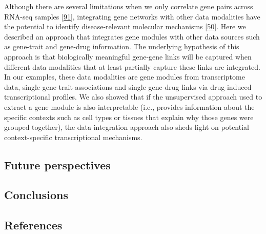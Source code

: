 Although there are several limitations when we only correlate gene pairs across RNA-seq samples {[}\protect\hyperlink{ref-jVQ2rMqc}{91}{]}, integrating gene networks with other data modalities have the potential to identify disease-relevant molecular mechanisms {[}\protect\hyperlink{ref-dg9nKuy0}{50}{]}.
Here we described an approach that integrates gene modules with other data sources such as gene-trait and gene-drug information.
The underlying hypothesis of this approach is that biologically meaningful gene-gene links will be captured when different data modalities that at least partially capture these links are integrated.
In our examples, these data modalities are gene modules from transcriptome data, single gene-trait associations and single gene-drug links via drug-induced transcriptional profiles.
We also showed that if the unsupervised approach used to extract a gene module is also interpretable (i.e., provides information about the specific contexts such as cell types or tissues that explain why those genes were grouped together), the data integration approach also sheds light on potential context-specific transcriptional mechanisms.

\hypertarget{future-perspectives}{%
\subsection{Future perspectives}\label{future-perspectives}}

\hypertarget{conclusions}{%
\subsection{Conclusions}\label{conclusions}}

\hypertarget{references}{%
\subsection{References}\label{references}}

